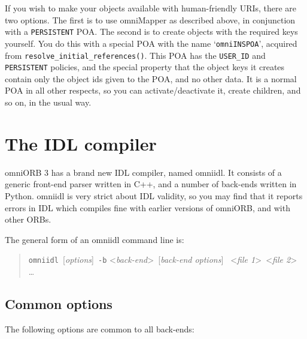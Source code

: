 \documentclass[11pt,twoside,a4paper]{book}
\newcommand{\code}[1]{\texttt{#1}}
\newcommand{\op}[1]{\texttt{#1()}}
\newcommand{\cmdline}[1]{\texttt{#1}}
\begin{document}
If you wish to make your objects available with human-friendly URIs,
there are two options. The first is to use omniMapper as described
above, in conjunction with a \code{PERSISTENT} POA. The second is to
create objects with the required keys yourself. You do this with a
special POA with the name `\texttt{omniINSPOA}', acquired from
\op{resolve\_initial\_references}. This POA has the \code{USER\_ID}
and \code{PERSISTENT} policies, and the special property that the
object keys it creates contain only the object ids given to the POA,
and no other data. It is a normal POA in all other respects, so you
can activate/deactivate it, create children, and so on, in the usual
way.





\chapter{The IDL compiler}
\label{chap:omniidl}

omniORB 3 has a brand new IDL compiler, named omniidl. It consists of
a generic front-end parser written in C++, and a number of back-ends
written in Python. omniidl is very strict about IDL validity, so you
may find that it reports errors in IDL which compiles fine with
earlier versions of omniORB, and with other ORBs.

The general form of an omniidl command line is:

\begin{quote} %
\cmdline{omniidl }[\textit{options}]\cmdline{ -b}%
<\textit{back-end}>\cmdline{ }[\textit{back-end options}]%
\cmdline{ }<\textit{file 1}>\cmdline{ }<\textit{file 2}>%
\cmdline{ }\dots
\end{quote}

\section{Common options}

The following options are common to all back-ends:
\end{document}
